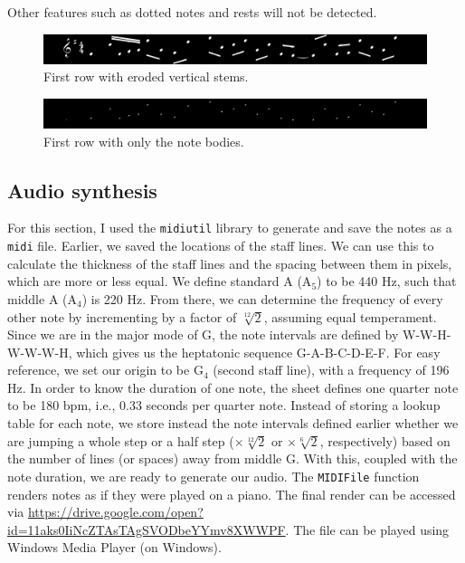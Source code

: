 \documentclass[12pt,a4paper]{article}
\begin{document}
Other features such as dotted notes and rests will not be detected.

\begin{figure}[htb]
	\centering
	\includegraphics[width=\textwidth]{anc_cutstem.png}
	\caption{First row with eroded vertical stems.}
	\label{fig:anc-cutstems}
\end{figure}

\begin{figure}[htb]
	\centering
	\includegraphics[width=\textwidth]{anc_notebodies.png}
	\caption{First row with only the note bodies.}
	\label{fig:anc-notebodies}
\end{figure}

\subsection{Audio synthesis}
For this section, I used the \texttt{midiutil} library to generate and save the notes as a \texttt{midi} file. Earlier, we saved the locations of the staff lines. We can use this to calculate the thickness of the staff lines and the spacing between them in pixels, which are more or less equal. We define standard A (A$_5$) to be 440 Hz, such that middle A (A$_4$) is 220 Hz. From there, we can determine the frequency of every other note by incrementing by a factor of $\sqrt[12]{2}$, assuming equal temperament. Since we are in the major mode of G, the note intervals are defined by W-W-H-W-W-W-H, which gives us the heptatonic sequence G-A-B-C-D-E-F\sh{}. For easy reference, we set our origin to be G$_4$ (second staff line), with a frequency of 196 Hz. In order to know the duration of one note, the sheet defines one quarter note to be 180 bpm, i.e., 0.33 seconds per quarter note. Instead of storing a lookup table for each note, we store instead the note intervals defined earlier whether we are jumping a whole step or a half step ($\times \sqrt[12]{2}$ or $\times \sqrt[6]{2}$, respectively) based on the number of lines (or spaces) away from middle G. With this, coupled with the note duration, we are ready to generate our audio. The \texttt{MIDIFile} function renders notes as if they were played on a piano. The final render can be accessed via \url{https://drive.google.com/open?id=11aks0IiNcZTAsTAgSVODbeYYmv8XWWPF}. The file can be played using Windows Media Player (on Windows).
\end{document}
